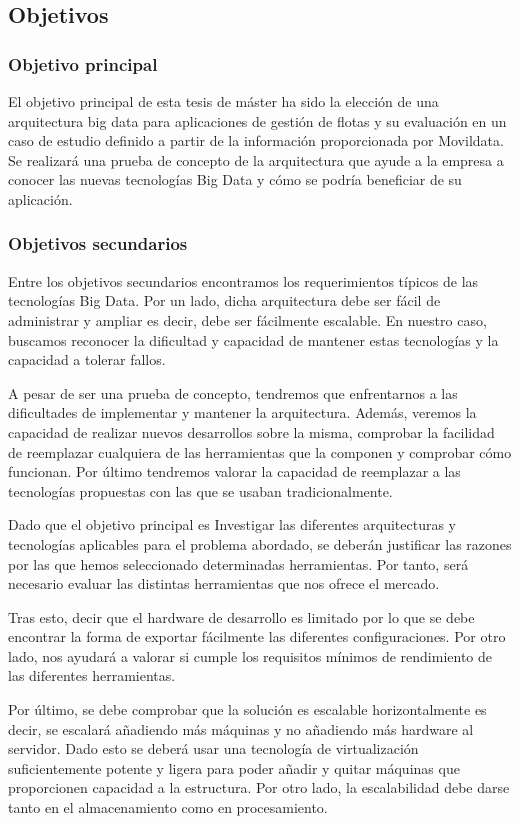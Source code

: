\subsection{Objetivos\label{objetivos}}
\subsubsection{Objetivo principal\label{obj_princ}}
El objetivo principal de esta tesis de máster ha sido la elección de una arquitectura big data para aplicaciones de gestión de flotas y su evaluación en un caso de estudio definido a partir de la información proporcionada por Movildata. Se realizará una prueba de concepto de la arquitectura que ayude a la empresa a conocer las nuevas tecnologías Big Data y cómo se podría beneficiar de su aplicación.
\par
\subsubsection{Objetivos secundarios\label{obj_sec}}
Entre los objetivos secundarios encontramos los requerimientos típicos de las tecnologías Big Data. Por un lado, dicha arquitectura debe ser fácil de administrar y ampliar es decir, debe ser fácilmente escalable. En nuestro caso, buscamos reconocer la dificultad y capacidad de mantener estas tecnologías y la capacidad a tolerar fallos.
\par
A pesar de ser una prueba de concepto, tendremos que enfrentarnos a las dificultades de implementar y mantener la arquitectura. Además, veremos la capacidad de realizar nuevos desarrollos sobre la misma, comprobar la facilidad de reemplazar cualquiera de las herramientas que la componen y comprobar cómo funcionan. Por último tendremos valorar la capacidad de reemplazar a las tecnologías propuestas con las que se usaban tradicionalmente.
\par
Dado que el objetivo principal es Investigar las diferentes arquitecturas y tecnologías aplicables para el problema abordado, se deberán justificar las razones por las que hemos seleccionado determinadas herramientas. Por tanto, será necesario evaluar las distintas herramientas que nos ofrece el mercado.
\par	 	 	 	
Tras esto, decir que el hardware de desarrollo es limitado por lo que se debe encontrar la forma de exportar fácilmente las diferentes configuraciones. Por otro lado, nos ayudará a valorar si cumple los requisitos mínimos de rendimiento de las diferentes herramientas.
\par
Por último, se debe comprobar que la solución es escalable horizontalmente es decir, se escalará añadiendo más máquinas y no añadiendo más hardware al servidor. Dado esto se deberá usar una tecnología de virtualización suficientemente potente y ligera para poder añadir y quitar máquinas que proporcionen capacidad a la estructura. Por otro lado, la escalabilidad debe darse tanto en el almacenamiento como en procesamiento.
\par


